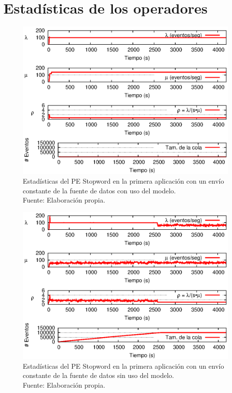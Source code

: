 \chapter{Estad\'isticas de los operadores}
\label{apendice:estadisticas-operadores}
\begin{figure}[!ht]
    \centering
    \captionsetup{justification=centering}
    \includegraphics[scale=0.9]{images/exp/app1/uniform/cm/statusStopwordPE.eps}
    \caption[Estad\'isticas del PE Stopword en la primera aplicaci\'on con un env\'io constante de la fuente de datos con uso del modelo.]{Estad\'isticas del PE Stopword en la primera aplicaci\'on con un env\'io constante de la fuente de datos con uso del modelo.\\Fuente: Elaboraci\'on propia.}
    \label{fig:app1-uniform-statusStopwordPE-cm}
\end{figure}

\begin{figure}[!ht]
    \centering
    \captionsetup{justification=centering}
    \includegraphics[scale=0.9]{images/exp/app1/uniform/sm/statusStopwordPE.eps}
    \caption[Estad\'isticas del PE Stopword en la primera aplicaci\'on con un env\'io constante de la fuente de datos sin uso del modelo.]{Estad\'isticas del PE Stopword en la primera aplicaci\'on con un env\'io constante de la fuente de datos sin uso del modelo.\\Fuente: Elaboraci\'on propia.}
    \label{fig:app1-uniform-statusStopwordPE-sm}
\end{figure}

